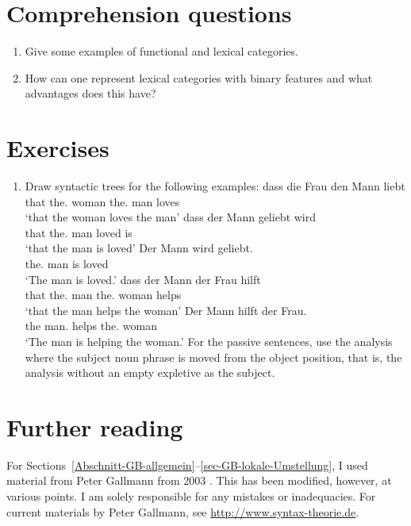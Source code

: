 \section*{Comprehension questions}

\begin{enumerate}
\item Give some examples of functional and lexical categories.
\item How can one represent lexical categories with binary features and what advantages does this have?
\end{enumerate}

\section*{Exercises}


\begin{enumerate}
\item Draw syntactic trees for the following examples:
\eal
\ex 
\gll dass die Frau den Mann liebt\\
     that the.\nom{} woman the.\acc{} man loves\\
\glt `that the woman loves the man'
\ex 
\gll dass der Mann geliebt wird\\
     that the.\nom{} man loved is\\
\glt `that the man is loved'
\ex 
\gll Der Mann wird geliebt.\\
     the.\nom{} man is loved\\
\glt `The man is loved.'
\ex 
\gll dass der Mann der Frau hilft\\
     that the.\nom{} man the.\dat{} woman helps\\
\glt `that the man helps the woman'
\ex 
\gll Der Mann hilft der Frau.\\
     the man.\nom{} helps the.\dat{} woman\\
\glt `The man is helping the woman.'
\zl
For the passive sentences, use the analysis where the subject noun phrase is moved from the object position, that is, the analysis
without an empty expletive as the subject.
\end{enumerate}



\section*{Further reading}

For Sections~\ref{Abschnitt-GB-allgemein}--\ref{sec-GB-lokale-Umstellung}, I used material from Peter Gallmann
from 2003 \citep{Gallmann2003a}. This has been modified, however, at various points. I am solely responsible for any mistakes or inadequacies.
For current materials by Peter Gallmann, see \url{http://www.syntax-theorie.de}. 

